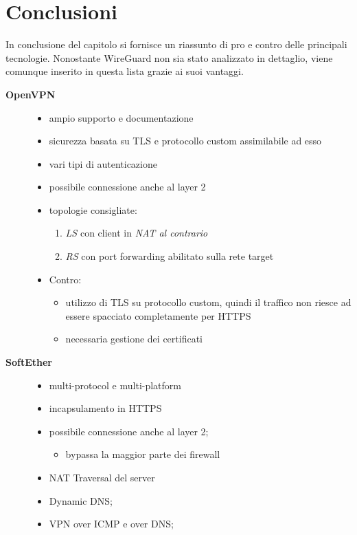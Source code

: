 \section{Conclusioni}
In conclusione del capitolo si fornisce un riassunto di pro e contro delle principali
tecnologie.
Nonostante WireGuard non sia stato analizzato
in dettaglio, viene comunque inserito in questa lista grazie ai suoi vantaggi.
\begin{description}
  \item[\textbf{OpenVPN}]
  \begin{itemize}
    \item ampio supporto e documentazione
    \item sicurezza basata su TLS e protocollo custom assimilabile ad esso
    \item vari tipi di autenticazione
    \item possibile connessione anche al layer 2
    \item topologie consigliate:
    \begin{enumerate}
      \item \textit{LS} con client in \textit{NAT al contrario}
      \item \textit{RS} con port forwarding abilitato sulla rete target
    \end{enumerate}
    \item Contro:
    \begin{itemize}
      \item utilizzo di TLS su protocollo custom, quindi il traffico non riesce
      ad essere spacciato completamente per HTTPS
      \item necessaria gestione dei certificati
    \end{itemize}
  \end{itemize}
    \item[\textbf{SoftEther}]
    \begin{itemize}
      \item multi-protocol e multi-platform
      \item incapsulamento in HTTPS
      \item possibile connessione anche al layer 2;
      \begin{itemize}
        \item bypassa la maggior parte dei firewall
      \end{itemize}
      \item NAT Traversal del server
      \item Dynamic DNS;
      \item VPN over ICMP e over DNS;

\end{itemize}
\end{description}
